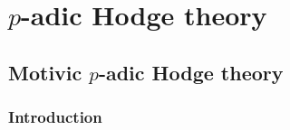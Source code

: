 \chapter{\texorpdfstring{$p$}{}-adic Hodge theory}
    \begin{abstract}
        
    \end{abstract}
    
    \minitoc
    
    \section{Motivic \texorpdfstring{$p$}{}-adic Hodge theory}
        \subsection{Introduction}
